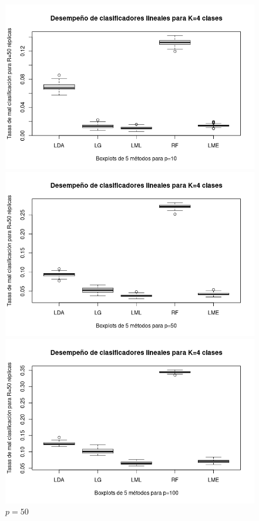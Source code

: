 \documentclass{report}
\begin{document}
  \begin{figure} [h]
  	\begin{multicols}{2}
  		\includegraphics[width=\linewidth]{4_clases_p10_sigma_I}\par 
  		\caption*{$p=10$}
  		\includegraphics[width=\linewidth]{4_clases_p50_sigma_I}\par 
  		\caption*{$p=50$}	 
  	\end{multicols}
  	\begin{multicols}{2}
  		\includegraphics[width=\linewidth]{4_clases_p100_sigma_I}\par

\end{multicols}
\end{figure}
\end{document}
